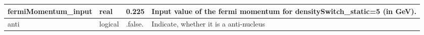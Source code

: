\documentclass{article}
\begin{document}
\begin{longtable}{llll}
\midrule
fermiMomentum\_input & \begin{minipage}[t]{2cm}real\end{minipage} & \begin{minipage}[t]{2cm}0.225\end{minipage} & \begin{minipage}[t]{12cm}Input value of the fermi momentum for densitySwitch\_static=5 (in GeV).\end{minipage}\\*
\midrule
anti & \begin{minipage}[t]{2cm}logical\end{minipage} & \begin{minipage}[t]{2cm}.false.\end{minipage} & \begin{minipage}[t]{12cm}Indicate, whether it is a anti-nucleus\end{minipage}\\*
\bottomrule
\end{longtable}
{ }



\end{document}
